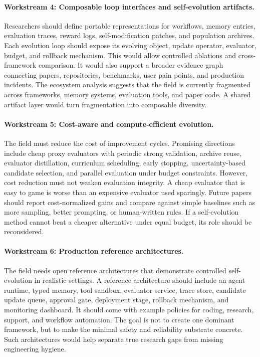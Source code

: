 \paragraph{Workstream 4: Composable loop interfaces and self-evolution artifacts.}
Researchers should define portable representations for workflows, memory entries, evaluation traces, reward logs, self-modification patches, and population archives. Each evolution loop should expose its evolving object, update operator, evaluator, budget, and rollback mechanism. This would allow controlled ablations and cross-framework comparison. It would also support a broader evidence graph connecting papers, repositories, benchmarks, user pain points, and production incidents. The ecosystem analysis suggests that the field is currently fragmented across frameworks, memory systems, evaluation tools, and paper code. A shared artifact layer would turn fragmentation into composable diversity.

\paragraph{Workstream 5: Cost-aware and compute-efficient evolution.}
The field must reduce the cost of improvement cycles. Promising directions include cheap proxy evaluators with periodic strong validation, archive reuse, evaluator distillation, curriculum scheduling, early stopping, uncertainty-based candidate selection, and parallel evaluation under budget constraints. However, cost reduction must not weaken evaluation integrity. A cheap evaluator that is easy to game is worse than an expensive evaluator used sparingly. Future papers should report cost-normalized gains and compare against simple baselines such as more sampling, better prompting, or human-written rules. If a self-evolution method cannot beat a cheaper alternative under equal budget, its role should be reconsidered.

\paragraph{Workstream 6: Production reference architectures.}
The field needs open reference architectures that demonstrate controlled self-evolution in realistic settings. A reference architecture should include an agent runtime, typed memory, tool sandbox, evaluator service, trace store, candidate update queue, approval gate, deployment stage, rollback mechanism, and monitoring dashboard. It should come with example policies for coding, research, support, and workflow automation. The goal is not to create one dominant framework, but to make the minimal safety and reliability substrate concrete. Such architectures would help separate true research gaps from missing engineering hygiene.

